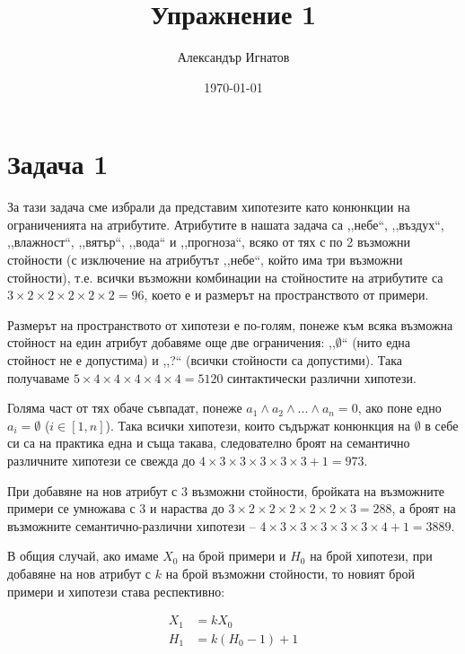 \documentclass{article}
\title{Упражнение 1}
\author{Александър Игнатов}
\date{\today}
\begin{document}
\maketitle

\section*{Задача 1}

За тази задача сме избрали да представим хипотезите като
конюнкции на ограниченията на атрибутите.
Атрибутите в нашата задача са ,,небе``, ,,въздух``,
,,влажност``, ,,вятър``, ,,вода`` и ,,прогноза``,
всяко от тях с по 2 възможни стойности
(с изключение на атрибутът ,,небе``,
който има три възможни стойности),
т.е. всички възможни комбинации на стойностите на
атрибутите са \( 3 \times 2 \times 2 \times 2 \times 2 \times 2 = 96 \), което е и размерът на пространството от примери.

Размерът на пространството от хипотези е по-голям, понеже към всяка възможна стойност на един атрибут добавяме още две ограничения: ,,\(\emptyset\)`` (нито една стойност не е допустима) и ,,?`` (всички стойности са допустими).
Така получаваме \( 5 \times 4 \times 4 \times 4 \times 4 \times 4 = 5120 \) синтактически различни хипотези.

Голяма част от тях обаче съвпадат, понеже \( a_1 \land a_2 \land ... \land a_n = 0 \), ако поне едно \( a_i = \emptyset \) (\( i \in [1, n] \)).
Така всички хипотези, които съдържат конюнкция на \(\emptyset\) в себе си са на практика една и съща такава,
следователно броят на семантично различните хипотези се свежда до \( 4 \times 3 \times 3 \times 3 \times 3 \times 3 + 1 = 973 \).

При добавяне на нов атрибут с 3 възможни стойности, бройката на възможните примери се умножава с 3 и нараства до \( 3 \times 2 \times 2 \times 2 \times 2 \times 2 \times 3 = 288 \),
а броят на възможните семантично-различни хипотези -- \( 4 \times 3 \times 3 \times 3 \times 3 \times 3 \times 4 + 1 = 3889 \).

В общия случай, ако имаме \( X_0 \) на брой примери и \( H_0 \) на брой хипотези, при добавяне на нов атрибут с \( k \) на брой възможни стойности,
то новият брой примери и хипотези става респективно:

\begin{align*}
    X_1 &= k X_0 \\
    H_1 &= k (H_0 - 1) + 1 \\
\end{align*}
\end{document}
